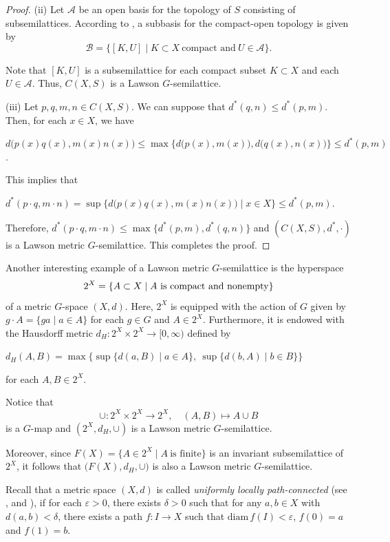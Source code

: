 \documentclass[12pt]{amsart}
\theoremstyle{definition}
\begin{document}
\begin{proof}
		(ii) Let $\mathcal{A}$ be an open basis for the topology of $S$ consisting of subsemilattices.  According to \cite[Chapter XXII, Proposition 5.1]{JD2}, a subbasis for the compact-open topology is given by 
		$$
			\mathcal{B}=\{[K,U]\mid K\subset X\ \mbox{compact\ and}\ U\in \mathcal{A}\}.
		$$
		
		Note that $[K,U]$ is a subsemilattice for each compact subset $K\subset X$ and each $U\in \mathcal{A}$. Thus, $C(X,S)$ is a Lawson $G$-semilattice.
		
		
		(iii) Let $p,q,m,n \in C(X,S)$. We can suppose that $d^*(q,n)\leq d^*(p,m)$. Then, for each $x\in X$, we have
		
		\begin{center}
			$d\big(p(x) q(x), m(x) n(x)\big)\leq \max\{d\big(p(x),m(x)\big), d\big(q(x), n(x)\big)\}\leq d^*(p,m)$.
		\end{center}
		
		This implies that
		\begin{center}
			$d^*(p\cdot q, m\cdot n)=\sup\{d\big(p(x)q(x), m(x) n(x)\big)\mid x\in X\}\leq d^*(p,m)$.
		\end{center}
		Therefore, $d^*(p\cdot q, m\cdot n)\leq \max\{d^*(p,m),d^*(q,n)\}$ and $(C(X,S),d^*,\cdot)$ is a Lawson metric $G$-semilattice. This completes the proof.
	\end{proof}
	
	
	Another interesting example of a Lawson metric $G$-semilattice  is the hyperspace $$2^X=\{A\subset X\mid A\ \rm{is\ compact\ and\ nonempty}\}$$ of a metric $G$-space $(X,d).$ Here, $2^X$ is equipped with the action of $G$ given by $g\cdot A=\{ga\mid a\in A\}$ for each $g\in G$ and $A\in 2^X$. Furthermore, it is endowed with the Hausdorff metric $d_H:2^X\times 2^X\rightarrow [0,\infty)$ defined by
	\begin{center}
		$d_H(A,B)=\max \big\{\sup \{d(a,B)\mid a\in A\},\ \sup\{d(b,A)\mid b\in B\}\big\}$
	\end{center} 
	for each $A, B\in 2^X$.
	
	Notice that 
	$$\cup: 2^X\times 2^X\rightarrow 2^X,\quad (A,B)\mapsto A\cup B$$
	 is a $G$-map and $(2^X,d_H,\cup)$ is a Lawson metric $G$-semilattice. 
	 
	 Moreover, since $F(X)=\{A\in 2^X\mid A\ \mbox{is finite}\}$ is an invariant subsemilattice of $2^X$,  it follows that $\big(F(X),d_H,\cup\big)$ is also a Lawson metric $G$-semilattice.
	
	Recall that a metric space $(X,d)$ is called \textit{uniformly locally path-connected} (see \cite{Banakh1}, \cite{KS1} and \cite{MYaguchi}), if for each $\varepsilon>0$, there exists $\delta>0$ such that for any $a, b\in X$ with $d(a,b)<\delta$, there exists a path $f: I\rightarrow X$ such that $\mbox{diam}\, f(I)<\varepsilon$, $f(0)=a$ and $f(1)=b$.
	
\end{document}
